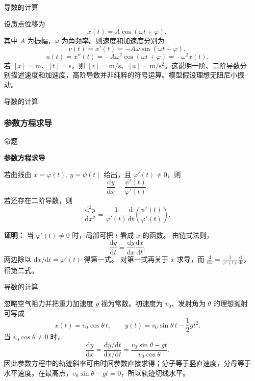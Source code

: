 \documentclass[aspectratio=169,10pt,fontset=fandol]{ctexbeamer}
\newcommand{\dd}{\mathrm{d}}
\begin{document}
\begin{frame}[t,fragile]{导数的计算}
\normalsize
{\normalsize
\begin{application}[物理：简谐运动与高阶导数]
设质点位移为
\[
x(t)=A\cos(\omega t+\varphi),
\]
其中 $A$ 为振幅，$\omega$ 为角频率。则速度和加速度分别为
\[
v(t)=x'(t)=-A\omega\sin(\omega t+\varphi),
\]
\[
a(t)=x''(t)=-A\omega^2\cos(\omega t+\varphi)
=-\omega^2x(t).
\]
若 $[x]=\mathrm m$、$[t]=\mathrm s$，则 $[v]=\mathrm{m/s}$、$[a]=\mathrm{m/s^2}$。这说明一阶、二阶导数分别描述速度和加速度，高阶导数并非纯粹的符号运算。模型假设理想无阻尼小振动。
\end{application}
}
\end{frame}
\begin{frame}[t,fragile]{导数的计算}
\small
{\small
\subsubsection*{参数方程求导}


}
\begin{block}{命题}
{\small
\textbf{参数方程求导}\par

若曲线由 $x=\varphi(t),\,y=\psi(t)$ 给出，且 $\varphi'(t)\neq0$，则
\[
\frac{\dd y}{\dd x}=\frac{\psi'(t)}{\varphi'(t)}.
\]
若还存在二阶导数，则
\[
\frac{\dd^2y}{\dd x^2}
=\frac{1}{\varphi'(t)}\frac{\dd}{\dd t}\left(\frac{\psi'(t)}{\varphi'(t)}\right).
\]

}
\end{block}
\pause
{\small
\textbf{证明：}
当 $\varphi'(t)\neq0$ 时，局部可把 $t$ 看成 $x$ 的函数。 由链式法则，
\[
\frac{\dd y}{\dd t}=\frac{\dd y}{\dd x}\frac{\dd x}{\dd t}.
\]
两边除以 $\dd x/\dd t=\varphi'(t)$ 得第一式。 对第一式再关于 $x$ 求导，而 $\frac{\dd}{\dd x}=\frac1{\varphi'(t)}\frac{\dd}{\dd t}$，得第二式。

}
\end{frame}
\begin{frame}[t,fragile]{导数的计算}
\normalsize
{\normalsize
\begin{application}
忽略空气阻力并把重力加速度 $g$ 视为常数。初速度为 $v_0$、发射角为 $\theta$ 的理想抛射可写成
\[
x(t)=v_0\cos\theta\,t,\qquad
y(t)=v_0\sin\theta\,t-\frac12gt^2.
\]
当 $v_0\cos\theta\neq0$ 时，
\[
\frac{\dd y}{\dd x}
=\frac{\dd y/\dd t}{\dd x/\dd t}
=\frac{v_0\sin\theta-gt}{v_0\cos\theta}.
\]
因此参数方程中的轨迹斜率可由时间参数直接求得；分子等于竖直速度，分母等于水平速度。在最高点，$v_0\sin\theta-gt=0$，所以轨迹切线水平。
\end{application}
}
\end{frame}
\end{document}
